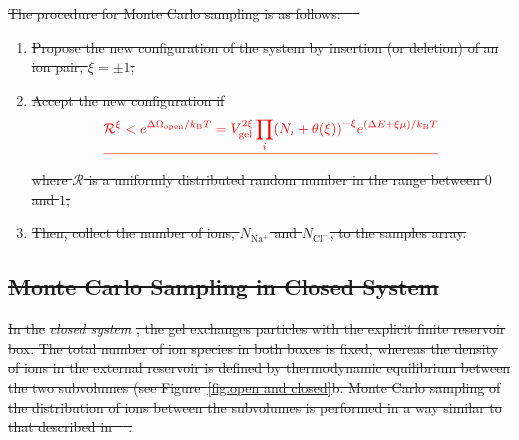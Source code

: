 \documentclass[gels,article,accept,pdftex,moreauthors]{Definitions/mdpi}
\newcommand{\kT}{k_\mathrm{B}T}
\newcommand{\Nna}{N_\mathrm{Na^+}}
\newcommand{\Ncl}{N_\mathrm{Cl^-}}
\newcommand{\Vgel}{V_\mathrm{gel}}
\newcommand{\reffig}[1]{Figure~\ref{#1}}
\providecommand{\DIFdel}[1]{{\protect\color{red}\sout{#1}}}                      %
\begin{document}
\DIFdel{The procedure for Monte Carlo sampling is as follows: \mbox{%
\cite{Frenlkel2002_book}
}\hspace{0pt}%
}%
\begin{enumerate}%
\item%
\DIFdel{Propose the new configuration of the system by insertion (or deletion) of an ion pair, $\xi=\pm1$;
	}%
\item%
\DIFdel{Accept the new configuration if
	}\begin{displaymath}
        \DIFdel{\mathcal{R}^{\xi}<e^{\Delta\Omega_\mathrm{open}/\kT}=\Vgel^{2\xi} \prod_i \left(N_i+\theta(\xi)\right)^{-\xi}e^{\left(\Delta E+\xi\mu\right)/\kT}%
	}\end{displaymath}%
\DIFdel{where $\mathcal{R}$ is a uniformly distributed random number in the range between $0$ and $1$;
	}%
\item%
\DIFdel{Then, collect the number of ions, $\Nna$ and $\Ncl$, to the samples array.
}
\end{enumerate}%

\subsection{\DIFdel{Monte Carlo Sampling in Closed System}}
\addtocounter{subsection}{-1}%

\DIFdel{In the }\emph{\DIFdel{closed system}}%
\DIFdel{, the gel exchanges particles with the explicit finite reservoir box. 
The total number of ion species in both boxes is fixed, whereas the density of ions in the external reservoir is defined by thermodynamic equilibrium between the two subvolumes (see \reffig{fig:open and closed}b. Monte Carlo sampling of the distribution of ions between the subvolumes is performed in a way similar to that described in \mbox{%
\cite{Panagiotopoulos1988b, Erdos2020}}\hspace{0pt}%
. 
}%
\end{document}
